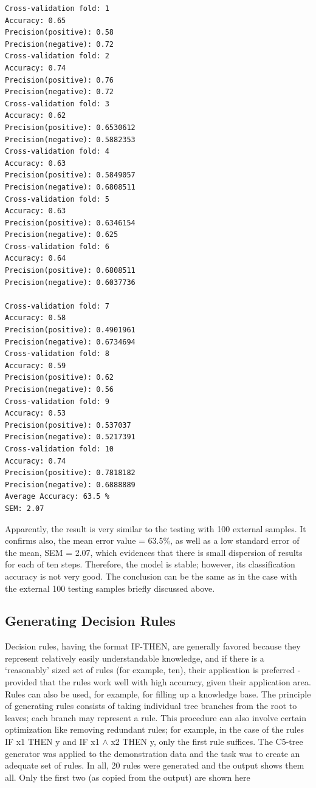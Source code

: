 \documentclass[11pt,openany,executivepaper]{book}
\begin{document}
\begin{verbatim}
Cross-validation fold: 1
Accuracy: 0.65
Precision(positive): 0.58
Precision(negative): 0.72
Cross-validation fold: 2
Accuracy: 0.74
Precision(positive): 0.76
Precision(negative): 0.72
Cross-validation fold: 3
Accuracy: 0.62
Precision(positive): 0.6530612
Precision(negative): 0.5882353
Cross-validation fold: 4
Accuracy: 0.63
Precision(positive): 0.5849057
Precision(negative): 0.6808511
Cross-validation fold: 5
Accuracy: 0.63
Precision(positive): 0.6346154
Precision(negative): 0.625
Cross-validation fold: 6
Accuracy: 0.64
Precision(positive): 0.6808511
Precision(negative): 0.6037736

Cross-validation fold: 7
Accuracy: 0.58
Precision(positive): 0.4901961
Precision(negative): 0.6734694
Cross-validation fold: 8
Accuracy: 0.59
Precision(positive): 0.62
Precision(negative): 0.56
Cross-validation fold: 9
Accuracy: 0.53
Precision(positive): 0.537037
Precision(negative): 0.5217391
Cross-validation fold: 10
Accuracy: 0.74
Precision(positive): 0.7818182
Precision(negative): 0.6888889
Average Accuracy: 63.5 %
SEM: 2.07
\end{verbatim}

Apparently, the result is very similar to the testing with 100 external samples.
It confirms also, the mean error value = 63.5\%, as well as a low standard error of
the mean, SEM = 2.07, which evidences that there is small dispersion of results
for each of ten steps. Therefore, the model is stable; however, its classification
accuracy is not very good.
The conclusion can be the same as in the case with the external 100 testing
samples briefly discussed above.

\subsection{Generating Decision Rules}

Decision rules, having the format IF-THEN, are generally favored because they
represent relatively easily understandable knowledge, and if there is a ‘reasonably’ sized set of rules (for example, ten), their application is preferred - provided
that the rules work well with high accuracy, given their application area. Rules
can also be used, for example, for filling up a knowledge base.
The principle of generating rules consists of taking individual tree branches
from the root to leaves; each branch may represent a rule. This procedure can
also involve certain optimization like removing redundant rules; for example, in
the case of the rules IF x1 THEN y and IF x1 $\wedge$ x2 THEN y, only the first rule
suffices.
The C5-tree generator was applied to the demonstration data and the task was
to create an adequate set of rules. In all, 20 rules were generated and the output
shows them all. Only the first two (as copied from the output) are shown here
\end{document}
